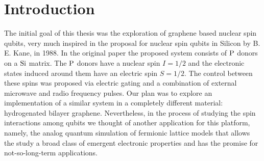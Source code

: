 \chapter{Introduction}
\label{ch:introduction}


The initial goal of this thesis was the exploration of graphene based nuclear spin qubits, very much inspired in the proposal for nuclear spin qubits in Silicon by B. E. Kane\cite{Kane1988}, in 1988.
In the original paper the proposed system consists of $\ce{P}$ donors on a $\ce{Si}$ matrix. The $\ce{P}$ donors have a nuclear spin $I=1/2$ and the electronic states induced around them have an electric spin $S=1/2$.
The control between these spins was proposed via electric gating and a combination of external microwave and radio frequency pulses.
Our plan was to explore an implementation of a similar system in a completely different material: hydrogenated bilayer graphene.
Nevertheless, in the process of studying the spin interactions among qubits we thought of another application for this platform, namely, the analog quantum simulation of fermionic lattice models that allows the study a broad class of emergent electronic properties and has the promise for not-so-long-term applications.
\medskip


